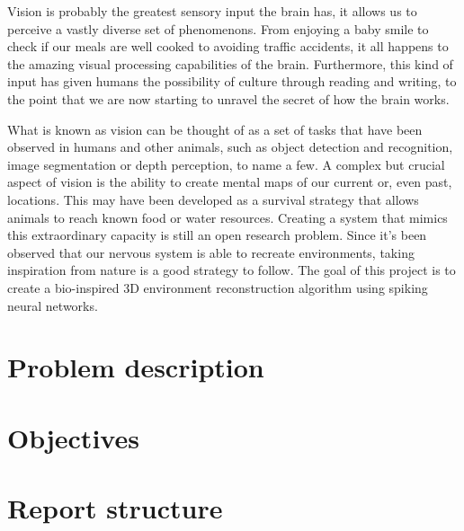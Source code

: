 Vision is probably the greatest sensory input the brain has, it allows us to perceive a vastly diverse set of phenomenons. From enjoying a baby smile to check if our meals are well cooked to avoiding traffic accidents, it all happens to the amazing visual processing capabilities of the brain. Furthermore, this kind of input has given humans the possibility of culture through reading and writing, to the point that we are now starting to unravel the secret of how the brain works.

What is known as vision can be thought of as a set of tasks that have been observed in humans and other animals, such as object detection and recognition, image segmentation or depth perception, to name a few. A complex but crucial aspect of vision is the ability to create mental maps of our current or, even past, locations. This may have been developed as a survival strategy that allows animals to reach known food or water resources. Creating a system that mimics this extraordinary capacity is still an open research problem. Since it's been observed that our nervous system is able to recreate environments, taking inspiration from nature is a good strategy to follow. The goal of this project is to create a bio-inspired 3D environment reconstruction algorithm using spiking neural networks. 


\section{Problem description}
\label{sec:intro:problem}


\section{Objectives}
\label{sec:intro:objectives}

%

\section{Report structure}
\label{sec:intro:structure}
